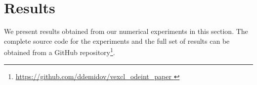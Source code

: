 \documentclass[final]{siamltex}
\begin{document}
%
%



%
%
%
%



\section{Results}

We present results obtained from our numerical experiments in this section. The complete
source code for the experiments and the full set of results can be obtained from a
GitHub repository\footnote{ \href{
https://github.com/ddemidov/vexcl_odeint_paper } {
https://github.com/ddemidov/vexcl\_odeint\_paper } }.
\end{document}
